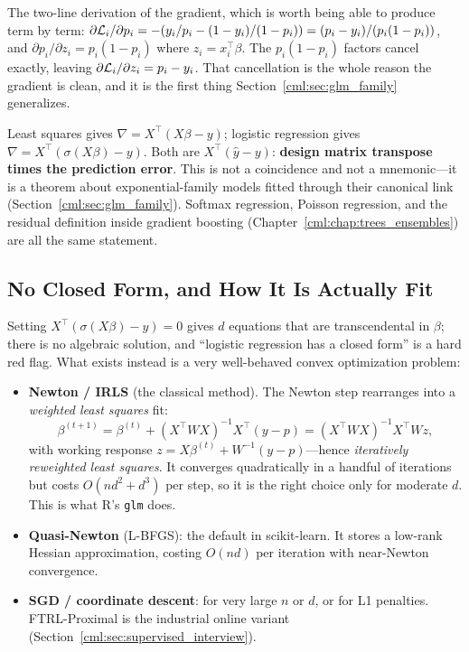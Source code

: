 The two-line derivation of the gradient, which is worth being able to produce term by term:
$\partial \mathcal{L}_i/\partial p_i = -(y_i/p_i - (1-y_i)/(1-p_i)) = (p_i - y_i)/(p_i(1-p_i))$, and $\partial p_i/\partial z_i = p_i(1-p_i)$ where $z_i = x_i^{\top}\beta$. The $p_i(1-p_i)$ factors cancel exactly, leaving $\partial \mathcal{L}_i/\partial z_i = p_i - y_i$. That cancellation is the whole reason the gradient is clean, and it is the first thing Section~\ref{cml:sec:glm_family} generalizes.

\begin{keyinsight}
Least squares gives $\nabla = X^{\top}(X\beta - y)$; logistic regression gives $\nabla = X^{\top}(\sigma(X\beta) - y)$. Both are $X^{\top}(\hat{y} - y)$: \textbf{design matrix transpose times the prediction error}. This is not a coincidence and not a mnemonic---it is a theorem about exponential-family models fitted through their canonical link (Section~\ref{cml:sec:glm_family}). Softmax regression, Poisson regression, and the residual definition inside gradient boosting (Chapter~\ref{cml:chap:trees_ensembles}) are all the same statement.
\end{keyinsight}

\subsection{No Closed Form, and How It Is Actually Fit}

Setting $X^{\top}(\sigma(X\beta) - y) = 0$ gives $d$ equations that are transcendental in $\beta$; there is no algebraic solution, and ``logistic regression has a closed form'' is a hard red flag. What exists instead is a very well-behaved convex optimization problem:

\begin{itemize}
    \item \textbf{Newton / IRLS} (the classical method). The Newton step rearranges into a \emph{weighted least squares} fit:
    \begin{equation*}
    \beta^{(t+1)} = \beta^{(t)} + (X^{\top}WX)^{-1}X^{\top}(y - p) = (X^{\top}WX)^{-1}X^{\top}W z,
    \end{equation*}
    with working response $z = X\beta^{(t)} + W^{-1}(y-p)$---hence \emph{iteratively reweighted least squares}. It converges quadratically in a handful of iterations but costs $O(nd^2 + d^3)$ per step, so it is the right choice only for moderate $d$. This is what R's \texttt{glm} does.
    \item \textbf{Quasi-Newton} (L-BFGS): the default in scikit-learn. It stores a low-rank Hessian approximation, costing $O(nd)$ per iteration with near-Newton convergence.
    \item \textbf{SGD / coordinate descent}: for very large $n$ or $d$, or for L1 penalties. FTRL-Proximal is the industrial online variant (Section~\ref{cml:sec:supervised_interview}).
\end{itemize}

